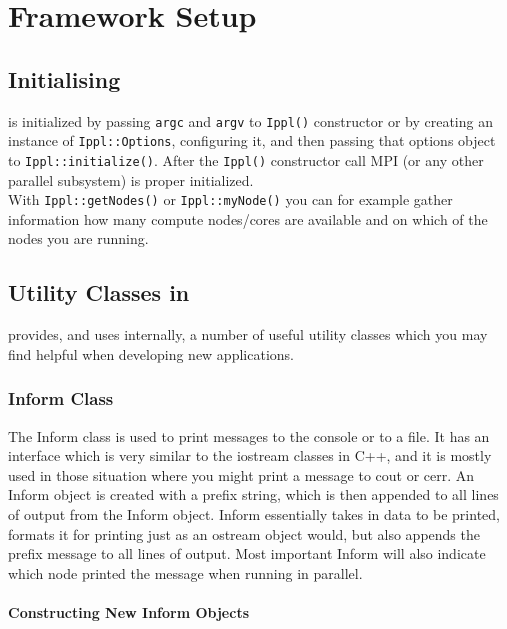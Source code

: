 \chapter{Framework Setup}
\label{sec:setup}

\section{Initialising \ippl}
\ippl is initialized by passing \texttt{argc} and \texttt{argv} to \texttt{Ippl()} constructor or by creating an instance of \texttt{Ippl::Options}, configuring it, and then passing that options object to \texttt{Ippl::initialize()}. After the \texttt{Ippl()} constructor call MPI (or any other parallel subsystem) is proper initialized. \\
With \texttt{Ippl::getNodes()} or \texttt{Ippl::myNode()} you can for example gather information how many compute nodes/cores are available and on which of the nodes you are running. \\
\begin{code} 
#include "Ippl.h"
int main(int argc, char *argv[])
{
    Ippl ippl(argc,argv);
    .....
\end{code}

\section{ Utility Classes in \ippl}
\ippl provides, and uses internally, a number of useful utility classes which you may find helpful when developing new applications. 

\subsection{Inform Class}
The Inform class is used to print messages to the console or to a file. It has an interface which is very similar to the iostream classes in C++, and it is mostly used in those situation where you might print a message to cout or cerr. An Inform object is created with a prefix string, which is then appended to all lines of output from the Inform object. Inform essentially takes in data to be printed, formats it for printing just as an ostream object would, but also appends the prefix message to all lines of output. Most important Inform will also indicate which node printed the message when running in parallel.

\subsubsection{Constructing New Inform Objects}

